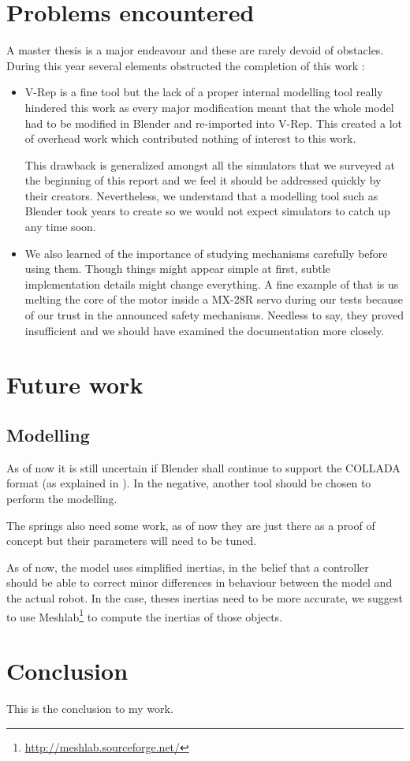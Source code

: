 \section{Problems encountered}
A master thesis is a major endeavour and these are rarely devoid of obstacles. During this year several elements obstructed the completion of this work : \begin{itemize}
\item V-Rep is a fine tool but the lack of a proper internal modelling tool really hindered this work as every major modification meant that the whole model had to be modified in Blender and re-imported into V-Rep. This created a lot of overhead work which contributed nothing of interest to this work. 

This drawback is generalized amongst all the simulators that we surveyed at the beginning of this report and we feel it should be addressed quickly by their creators. Nevertheless, we understand that a modelling tool such as Blender took years to create so we would not expect simulators to catch up any time soon.

\item We also learned of the importance of studying mechanisms carefully before using them. Though things might appear simple at first, subtle implementation details might change everything. A fine example of that is us melting the core of the motor inside a MX-28R servo during our tests because of our trust in the announced safety mechanisms. Needless to say, they proved insufficient and we should have examined the documentation more closely.
\end{itemize}


\section{Future work}
\subsection{Modelling}
As of now it is still uncertain if Blender shall continue to support the COLLADA format (as explained in \cite{blender_roadmap}). In the negative, another tool should be chosen to perform the modelling.

The springs also need some work, as of now they are just there as a proof of concept but their parameters will need to be tuned.

As of now, the model uses simplified inertias, in the belief that a controller should be able to correct minor differences in behaviour between the model and the actual robot. In the case, theses inertias need to be more accurate, we suggest to use Meshlab\footnote{\url{http://meshlab.sourceforge.net/}} to compute the inertias of those objects.

\section{Conclusion}
This is the conclusion to my work.
